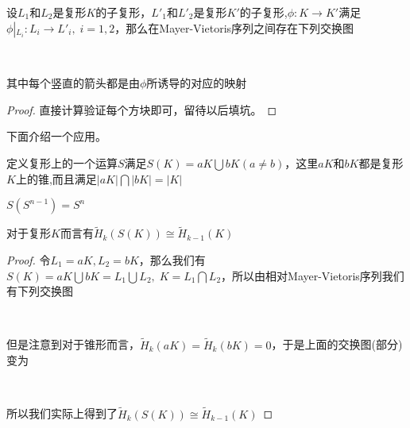 \begin{proposition}
设$L_{1}$和$L_{2}$是复形$K$的子复形，$L'_{1}$和$L'_{2}$是复形$K'$的子复形,$\phi:K\rightarrow K'$满足$\phi\left|_{L_{i}}\right.:L_{i}\rightarrow L'_{i},\;i=1,2$，那么在Mayer-Vietoris序列之间存在下列交换图
{\center
\footnotesize
{}
\\}
其中每个竖直的箭头都是由$\phi$所诱导的对应的映射
\end{proposition}
\begin{proof}
直接计算验证每个方块即可，留待以后填坑。
\end{proof}
下面介绍一个应用。
\begin{definition}
定义复形上的一个运算$S$满足$S(K)=aK\bigcup bK(a\neq b)$，这里$aK$和$bK$都是复形$K$上的锥,而且满足$|aK|\bigcap |bK|=|K|$
\end{definition}
\begin{example}
$S(S^{n-1})=S^{n}$
\end{example}
\begin{proposition}
对于复形$K$而言有$\tilde{H}_{k}(S(K))\cong \tilde{H}_{k-1}(K)$
\end{proposition}
\begin{proof}
令$L_{1}=aK,L_{2}=bK$，那么我们有$S(K)=aK\bigcup bK=L_{1}\bigcup L_{2},\;K=L_{1}\bigcap L_{2}$，所以由相对Mayer-Vietoris序列我们有下列交换图
{\center
\footnotesize
{}
\\}
但是注意到对于锥形而言，$\tilde{H}_{k}(aK)=\tilde{H}_{k}(bK)=0$，于是上面的交换图(部分)变为
{\center
{}
\\}
所以我们实际上得到了$\tilde{H}_{k}(S(K))\cong \tilde{H}_{k-1}(K)$
\end{proof}
